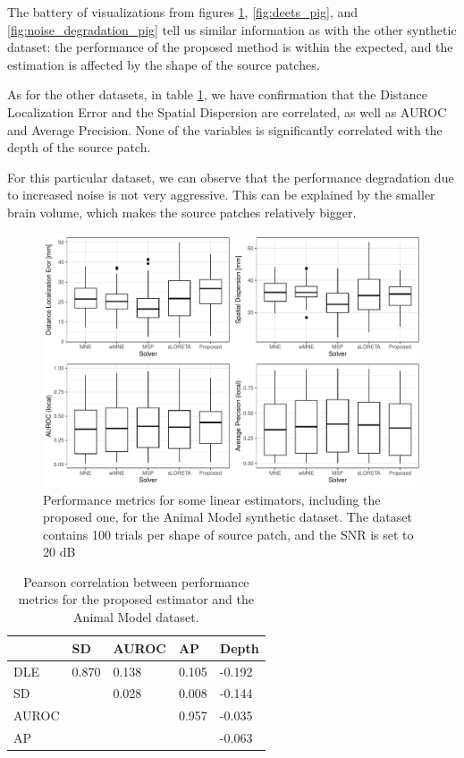 The battery of visualizations from figures \ref{fig:results1_pig}, \ref{fig:deets_pig}, and \ref{fig:noise_degradation_pig} tell us similar information as with the other synthetic dataset: the performance of the proposed method is within the expected, and the estimation is affected by the shape of the source patches.

As for the other datasets, in table \ref{tab:corr_pig}, we have confirmation that the Distance Localization Error and the Spatial Dispersion are correlated, as well as AUROC and Average Precision.
%
None of the variables is significantly correlated with the depth of the source patch.

For this particular dataset, we can observe that the performance degradation due to increased noise is not very aggressive.
%
This can be explained by the smaller brain volume, which makes the source patches relatively bigger.

\begin{figure}
    \centering
    \includegraphics[width=0.9\linewidth]{img_stats/pig_plot_EvalMetrics_protocol04_vol5k_pigALL.pdf}
    \caption{Performance metrics for some linear estimators, including the proposed one, for the Animal Model synthetic dataset. The dataset contains 100 trials per shape of source patch, and the SNR is set to 20 dB}
    \label{fig:results1_pig}
\end{figure}

\begin{table}[]
\centering
\begin{tabular}{@{}lllll@{}}
\toprule
      & SD    & AUROC & AP    & Depth  \\
\midrule
DLE   & 0.870 & 0.138 & 0.105 & -0.192 \\
SD    &       & 0.028 & 0.008 & -0.144 \\
AUROC &       &       & 0.957 & -0.035 \\
AP    &       &       &       & -0.063 \\
\bottomrule
\end{tabular}
\caption{Pearson correlation between performance metrics for the proposed estimator and the Animal Model dataset.}
\label{tab:corr_pig}
\end{table}

